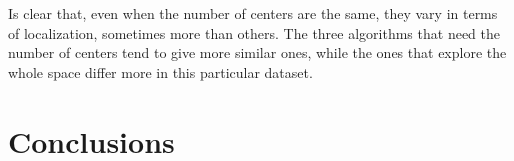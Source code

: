 \documentclass[conference]{IEEEtran}
\begin{document}
Is clear that, even when the number of centers are the same, they vary in terms of localization, sometimes more than others. The three algorithms that need the number of centers tend to give more similar ones, while the ones that explore the whole space differ more in this particular dataset.


\section{Conclusions}

\nocite{*}


\end{document}
